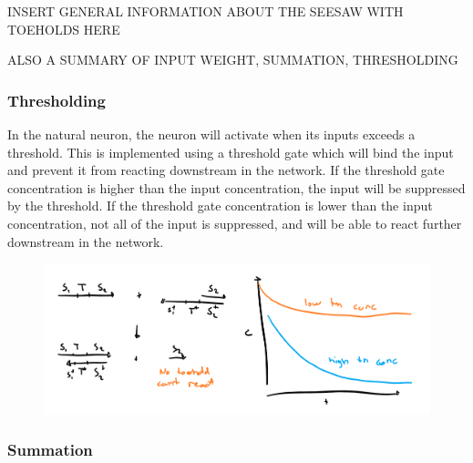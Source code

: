 INSERT GENERAL INFORMATION ABOUT THE SEESAW WITH TOEHOLDS HERE

ALSO A SUMMARY OF INPUT WEIGHT, SUMMATION, THRESHOLDING

\subsubsection{Thresholding}
In the natural neuron, the neuron will activate when its inputs exceeds a threshold. This is implemented using a threshold gate which will bind the input and prevent it from reacting downstream in the network. If the threshold gate concentration is higher than the input concentration, the input will be suppressed by the threshold. If the threshold gate concentration is lower than the input concentration, not all of the input is suppressed, and will be able to react further downstream in the network.

\begin{figure}[H]
\centering
\includegraphics[width=\columnwidth]{images/seesaw_threshold.png}
\caption{}
\label{seesaw_threshold}
\end{figure}

\subsubsection{Summation}
